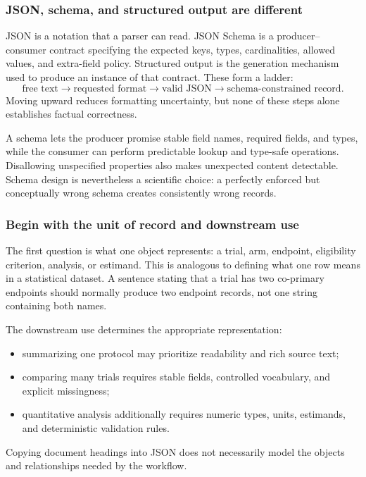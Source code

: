 \documentclass[12pt,oneside]{book}
\numberwithin{equation}{section}
\theoremstyle{definition}
\theoremstyle{plain}
\theoremstyle{remark}
\begin{document}
\subsubsection{JSON, schema, and structured output are different}

JSON is a notation that a parser can read.  JSON Schema is a producer--consumer
contract specifying the expected keys, types, cardinalities, allowed values,
and extra-field policy.  Structured output is the generation mechanism used to
produce an instance of that contract.  These form a ladder:
\[
 \text{free text}\longrightarrow\text{requested format}
 \longrightarrow\text{valid JSON}\longrightarrow
 \text{schema-constrained record}.
\]
Moving upward reduces formatting uncertainty, but none of these steps alone
establishes factual correctness.

A schema lets the producer promise stable field names, required fields, and
types, while the consumer can perform predictable lookup and type-safe
operations.  Disallowing unspecified properties also makes unexpected content
detectable.  Schema design is nevertheless a scientific
choice: a perfectly enforced but conceptually wrong schema creates consistently
wrong records.

\subsubsection{Begin with the unit of record and downstream use}

The first question is what one object represents: a trial, arm, endpoint,
eligibility criterion, analysis, or estimand.  This is analogous to defining
what one row means in a statistical dataset.  A sentence stating that a trial
has two co-primary endpoints should normally produce two endpoint records, not
one string containing both names.

The downstream use determines the appropriate representation:
\begin{itemize}
    \item summarizing one protocol may prioritize readability and rich source
    text;
    \item comparing many trials requires stable fields, controlled vocabulary,
    and explicit missingness;
    \item quantitative analysis additionally requires numeric types, units,
    estimands, and deterministic validation rules.
\end{itemize}
Copying document headings into JSON does not necessarily model the objects and
relationships needed by the workflow.
\end{document}

